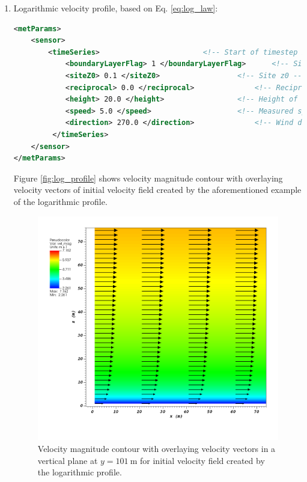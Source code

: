 \begin{enumerate}
\item Logarithmic velocity profile, based on Eq. \ref{eq:log_law}:

\begin{lstlisting}[language=XML]
<metParams>
	<sensor>
	    <timeSeries>						<!-- Start of timestep informastion for a sensor -->
       		<boundaryLayerFlag> 1 </boundaryLayerFlag> 		<!-- Site boundary layer flag (1-log (default), 2-exp, 3-urban canopy, 4-data entry) -->
       		<siteZ0> 0.1 </siteZ0> 					<!-- Site z0 -->
       		<reciprocal> 0.0 </reciprocal> 				<!-- Reciprocal Monin-Obukhov Length (1/m) -->
       		<height> 20.0 </height> 				<!-- Height of the sensor -->
       		<speed> 5.0 </speed> 					<!-- Measured speed at the sensor height -->
       		<direction> 270.0 </direction> 				<!-- Wind direction of sensor -->
    	 </timeSeries>
	</sensor>
</metParams>
\end{lstlisting}

Figure \ref{fig:log_profile} shows velocity magnitude contour with overlaying velocity vectors of initial velocity field created by the aforementioned example of the logarithmic profile.

\begin{figure}[H]
\includegraphics[width=\textwidth,keepaspectratio]{Images/log_y_101.png}
\caption{Velocity magnitude contour with overlaying velocity vectors in a vertical plane at $y=101\ \si{\meter}$ for initial velocity field created by the logarithmic profile.}
\end{figure}
\noindent


\end{enumerate}
